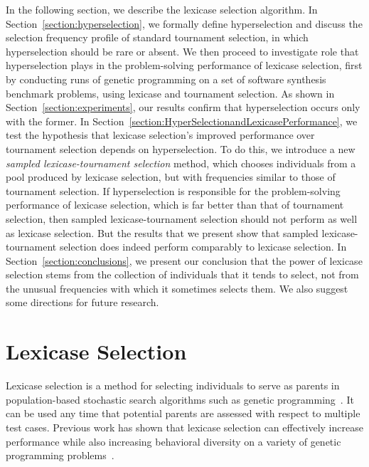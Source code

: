 \documentclass{sig-alternate}
\begin{document}

In the following section, we  describe the lexicase selection algorithm. In Section~\ref{section:hyperselection}, we formally define hyperselection and discuss the selection frequency profile of standard tournament selection, in which hyperselection should be rare or absent. We then proceed to investigate role that hyperselection plays in the problem-solving performance of lexicase selection, first by conducting runs of genetic programming on a set of software synthesis benchmark problems, using lexicase and tournament selection. As shown in Section~\ref{section:experiments}, our results confirm that hyperselection occurs only with the former. In Section~\ref{section:HyperSelectionandLexicasePerformance}, we test the hypothesis that   lexicase selection's improved performance over tournament selection depends on hyperselection. To do this, we introduce a new \emph{sampled lexicase-tournament selection} method, which chooses individuals from a pool produced by lexicase selection, but with frequencies similar to those of tournament selection. If hyperselection is responsible for the problem-solving performance of lexicase selection, which is far better than that of tournament selection, then sampled lexicase-tournament selection should not perform as well as lexicase selection. But the results that we present show that sampled lexicase-tournament selection does indeed perform comparably to lexicase selection. In Section~\ref{section:conclusions}, we present our conclusion that the power of lexicase selection stems from the collection of individuals that it tends to select, not from the unusual frequencies with which it sometimes selects them. We also suggest some directions for future research.


\section{Lexicase Selection}
\label{section:lexicase}


Lexicase selection is a method for selecting individuals to serve as parents in population-based stochastic search algorithms such as genetic programming~\cite{Helmuth:2014:ieeeTEC, Spector:2012:GECCOcompANEW}. %
It can be used any time that potential parents are assessed with respect to multiple test cases.
Previous work has shown that lexicase selection can effectively increase performance while also increasing behavioral diversity on a variety of genetic programming problems~\cite{Helmuth:2015:GECCO, Helmuth:2014:ieeeTEC, Krawiec:2015:GECCO:smgpWorkshop, Helmuth:2015:GPTP}.
\end{document}

